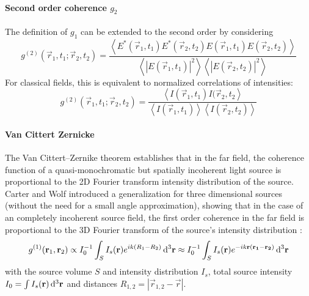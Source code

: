 \paragraph{Second order coherence $g_2$}
The definition of $g_1$ can be extended to the second order by considering
\begin{equation*}
	g^{(2)}(\vec{r}_1,t_1;\vec{r}_2,t_2)= 
	\frac{\left< E^*(\vec{r}_1,t_1)E^*(\vec{r}_2,t_2)E(\vec{r}_1,t_1)E(\vec{r}_2,t_2) \right>}{\left<\left | E(\vec{r}_1,t_1)\right |^2 \right> \left< \left |E(\vec{r}_2,t_2)\right |^2 \right>}	
\end{equation*}
For classical fields, this is equivalent  to normalized correlations of intensities:
\begin{equation}
	g^{(2)}(\vec{r}_1,t_1;\vec{r}_2,t_2)= 
		\frac{\left< I(\vec{r}_1,t_1)I(\vec{r}_2,t_2 \right>}{\left<I(\vec{r}_1,t_1)\right>\left<I(\vec{r}_2,t_2)\right>}	
		\label{eq:g2}
\end{equation}


\paragraph{Van Cittert Zernicke}
The Van Cittert–Zernike theorem establishes that in the far field, the coherence function of a 
quasi-monochromatic but spatially incoherent light source is proportional to the 2D Fourier transform intensity distribution of the source. Carter and Wolf introduced a generalization for three dimensional sources (without the need for a small angle approximation), showing that in the case of an completely incoherent source field, the first order coherence in the far field is proportional to the 3D Fourier transform of the source's intensity distribution \cite{rosen1996, goodman2005, carter1981}:
\begin{equation}
	g^{(1)}(\mathbf{r}_1,\mathbf{r}_2) \propto I_0^{-1} \int_{S} I_s(\mathbf{r}) e^{ik(R_1-R_2)} \operatorname{\mathrm{d}^3 \!} \mathbf{r} \approx I_0^{-1} \int_{S} I_s(\mathbf{r}) e^{-ik\mathbf{r}(\mathbf{r_1}-\mathbf{r_2})} \operatorname{\mathrm{d}^3 \!} \mathbf{r}
	\label{eq:vcz}
\end{equation}
with the source volume $S$ and intensity distribution $I_s$, total source intensity $I_0=\int I_s(\mathbf{r}) \operatorname{\mathrm{d}^3 \!} \mathbf{r}$ and distances $R_{1,2}=\left|\vec{r}_{1,2}-\vec{r}\right|$.




